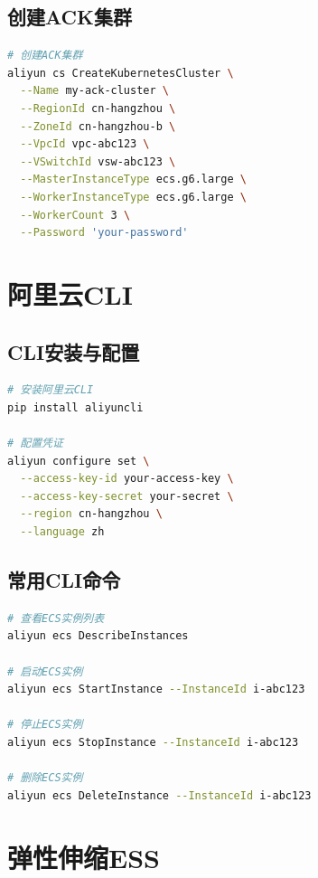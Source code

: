 \documentclass[12pt,UTF8]{ctexbook}
\begin{document}
\subsection{创建ACK集群}

\begin{lstlisting}[language=bash]
# 创建ACK集群
aliyun cs CreateKubernetesCluster \
  --Name my-ack-cluster \
  --RegionId cn-hangzhou \
  --ZoneId cn-hangzhou-b \
  --VpcId vpc-abc123 \
  --VSwitchId vsw-abc123 \
  --MasterInstanceType ecs.g6.large \
  --WorkerInstanceType ecs.g6.large \
  --WorkerCount 3 \
  --Password 'your-password'
\end{lstlisting}

\section{阿里云CLI}
\label{sec:aliyun-cli}

\subsection{CLI安装与配置}

\begin{lstlisting}[language=bash]
# 安装阿里云CLI
pip install aliyuncli

# 配置凭证
aliyun configure set \
  --access-key-id your-access-key \
  --access-key-secret your-secret \
  --region cn-hangzhou \
  --language zh
\end{lstlisting}

\subsection{常用CLI命令}

\begin{lstlisting}[language=bash]
# 查看ECS实例列表
aliyun ecs DescribeInstances

# 启动ECS实例
aliyun ecs StartInstance --InstanceId i-abc123

# 停止ECS实例
aliyun ecs StopInstance --InstanceId i-abc123

# 删除ECS实例
aliyun ecs DeleteInstance --InstanceId i-abc123
\end{lstlisting}

\section{弹性伸缩ESS}
\label{sec:ess}
\end{document}
